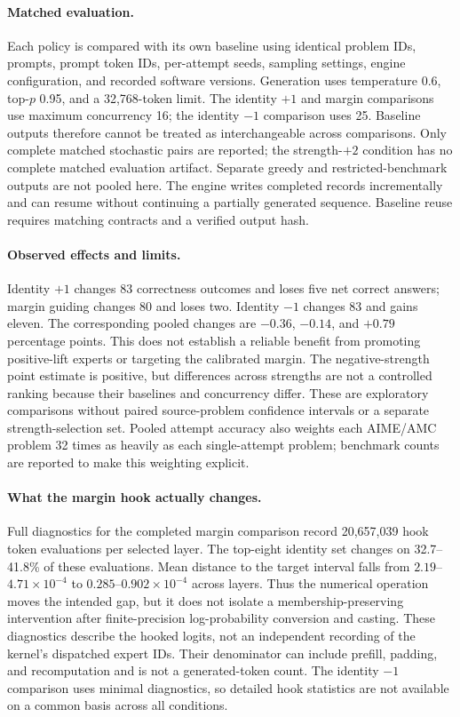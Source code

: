 \paragraph{Matched evaluation.}
Each policy is compared with its own baseline using identical problem IDs,
prompts, prompt token IDs, per-attempt seeds, sampling settings, engine
configuration, and recorded software versions. Generation uses temperature
0.6, top-$p$ 0.95, and a 32,768-token limit. The identity $+1$ and margin
comparisons use maximum concurrency 16; the identity $-1$ comparison uses
25. Baseline outputs therefore cannot be treated as interchangeable across
comparisons. Only complete matched stochastic pairs are reported; the
strength-$+2$ condition has no complete matched evaluation artifact.
Separate greedy and restricted-benchmark outputs are not pooled here.
The engine writes completed records incrementally and can resume without
continuing a partially generated sequence. Baseline reuse requires matching
contracts and a verified output hash.




\paragraph{Observed effects and limits.}
Identity $+1$ changes 83 correctness outcomes and loses five net correct
answers; margin guiding changes 80 and loses two. Identity $-1$ changes 83
and gains eleven. The corresponding pooled changes are $-0.36$, $-0.14$,
and $+0.79$ percentage points. This does not establish a reliable benefit
from promoting positive-lift experts or targeting the calibrated margin.
The negative-strength point estimate is positive, but differences across
strengths are not a controlled ranking because their baselines and
concurrency differ. These are exploratory comparisons without paired
source-problem confidence intervals or a separate strength-selection set.
Pooled attempt accuracy also weights each AIME/AMC problem 32 times as
heavily as each single-attempt problem; benchmark counts are reported to
make this weighting explicit.

\paragraph{What the margin hook actually changes.}
Full diagnostics for the completed margin comparison record 20,657,039
hook token evaluations per selected layer. The top-eight identity set changes
on 32.7--41.8\% of these evaluations. Mean distance to the target interval
falls from $2.19$--$4.71\times10^{-4}$ to
$0.285$--$0.902\times10^{-4}$ across layers. Thus the numerical operation
moves the intended gap, but it does not isolate a membership-preserving
intervention after finite-precision log-probability conversion and casting.
These diagnostics describe the hooked logits, not an independent recording
of the kernel's dispatched expert IDs. Their denominator can include
prefill, padding, and recomputation and is not a generated-token count.
The identity $-1$ comparison uses minimal diagnostics, so detailed hook
statistics are not available on a common basis across all conditions.
